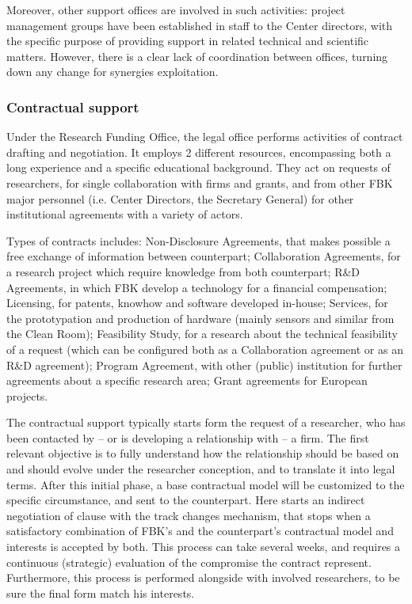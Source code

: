 Moreover, other support offices are involved in such activities: project management groups have been established in staff to the Center directors, with the specific purpose of providing support in related technical and scientific matters. However, there is a clear lack of coordination between offices, turning down any change for synergies exploitation.

\subsubsection{Contractual support}

Under the Research Funding Office, the legal office performs activities of contract drafting and negotiation. It employs 2 different resources, encompassing both a long experience and a specific educational background. They act on requests of researchers, for single collaboration with firms and grants, and from other FBK major personnel (i.e. Center Directors, the Secretary General) for other institutional agreements with a variety of actors.

Types of contracts includes: Non-Disclosure Agreements, that makes possible a free exchange of information between counterpart; Collaboration Agreements, for a research project which require knowledge from both counterpart; R\&D Agreements, in which FBK develop a technology for a financial compensation; Licensing, for patents, knowhow and software developed in-house; Services, for the prototypation and production of hardware (mainly sensors and similar from the Clean Room); Feasibility Study, for a research about the technical feasibility of a request (which can be configured both as a Collaboration agreement or as an R\&D agreement); Program Agreement, with other (public) institution for further agreements about a specific research area; Grant agreements for European projects. 

The contractual support typically starts form the request of a researcher, who has been contacted by – or is developing a relationship with – a firm. The first relevant objective is to fully understand how the relationship should be based on and should evolve under the researcher conception, and to translate it into legal terms. After this initial phase, a base contractual model will be customized to the specific circumstance, and sent to the counterpart. Here starts an indirect negotiation of clause with the track changes mechanism, that stops when a satisfactory combination of FBK’s and the counterpart’s contractual model and interests is accepted by both. This process can take several weeks, and requires a continuous (strategic) evaluation of the compromise the contract represent. Furthermore, this process is performed alongside with involved researchers, to be sure the final form match his interests.

